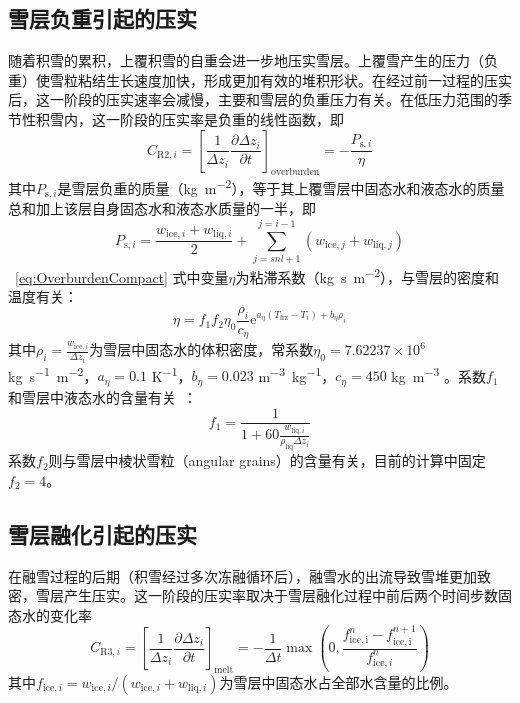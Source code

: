\subsection{雪层负重引起的压实}
随着积雪的累积，上覆积雪的自重会进一步地压实雪层。上覆雪产生的压力（负重）使雪粒粘结生长速度加快，形成更加有效的堆积形状。在经过前一过程的压实后，这一阶段的压实速率会减慢，主要和雪层的负重压力有关。在低压力范围的季节性积雪内，这一阶段的压实率是负重的线性函数\citep{anderson1976point}，即
\begin{equation}\label{eq:OverburdenCompact}
  C_{\mathrm{R2},i}=\left[\frac{1}{\Delta {z_i}} \frac{\partial \Delta {z_i}}{\partial {t}}\right]_{\text {overburden}}=-\frac{P_{\mathrm{s},i}}{\eta}
\end{equation}
其中$P_{\mathrm{s},i}$是雪层负重的质量（\unit{kg.m^{-2}}），等于其上覆雪层中固态水和液态水的质量总和加上该层自身固态水和液态水质量的一半，即
\begin{equation}
  P_{\mathrm{s},i}=\frac{w_{\mathrm{ice},i}+w_{\mathrm{liq},i}}{2}+\sum_{{j}={snl}+1}^{{j}={i}-1}\left({w}_{\mathrm{ice},j}+{w}_{\mathrm{liq},j}\right)
\end{equation}
~\eqref{eq:OverburdenCompact} 式中变量$\eta$为粘滞系数（\unit{kg.s.m^{-2}}），与雪层的密度和温度有关：
\begin{equation}
  \eta=f_1 f_2 \eta_0 \frac{\rho_i}{c_\eta} {\mathrm e}^{a_\eta \left(T_{\mathrm {frz}} -T_i\right)+b_\eta \rho_i}
\end{equation}
其中$\rho_i=\frac{w_{\mathrm{ice},i}}{\Delta z_i}$为雪层中固态水的体积密度，常系数$\eta_0=7.62237 \times 10^6$ \unit{kg.s^{-1}.m^{-2}}，$a_\eta=0.1$ \unit{K^{-1}}，$b_\eta=0.023$ \unit{m^{-3}.kg^{-1}}，$c_\eta=450$ \unit{kg.m^{-3}} \citep{Kampenhout2017}。系数$f_1$和雪层中液态水的含量有关~\citep{Vionnet2012}：
\begin{equation}
  f_1=\frac{1}{1+60\frac{w_{\mathrm{liq},i}}{\rho_{\mathrm{liq}}\Delta z_i}}
\end{equation}
系数$f_2$则与雪层中棱状雪粒（angular grains）的含量有关，目前的计算中固定$f_2=4$。

\subsection{雪层融化引起的压实}
在融雪过程的后期（积雪经过多次冻融循环后），融雪水的出流导致雪堆更加致密，雪层产生压实。这一阶段的压实率取决于雪层融化过程中前后两个时间步数固态水的变化率
\begin{equation}
  C_{\mathrm{R3},i}=\left[\frac{1}{\Delta {z_i}} \frac{\partial \Delta {z_i}}{\partial {t}}\right]_{\text{melt}}=-\frac{1}{\Delta {t}}\max\left(0,\frac{{f}_{\mathrm{{ice},i}}^{n}-{f}_{\mathrm{{ice},i}}^{n+1}}{{f}_{\mathrm{ice},i}^{n}}\right)
\end{equation}
其中$f_{\mathrm{ice},i}=w_{\mathrm{ice},i}/\left({w_{\mathrm{ice},i}+w_{\mathrm{liq},i}}\right)$为雪层中固态水占全部水含量的比例。

